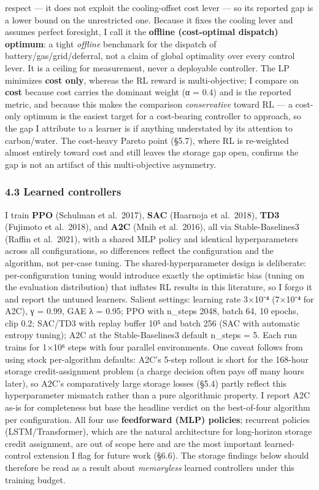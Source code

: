 \documentclass[
  11pt,
]{article}
\begin{document}
\begin{itemize}
  respect --- it does not exploit the cooling-offset cost lever --- so
  its reported gap is a lower bound on the unrestricted one. Because it
  fixes the cooling lever and assumes perfect foresight, I call it the
  \textbf{offline (cost-optimal dispatch) optimum}: a tight
  \emph{offline} benchmark for the dispatch of
  battery/gas/grid/deferral, not a claim of global optimality over every
  control lever. It is a ceiling for measurement, never a deployable
  controller. The LP minimizes \textbf{cost only}, whereas the RL reward
  is multi-objective; I compare on \textbf{cost} because cost carries
  the dominant weight (α = 0.4) and is the reported metric, and because
  this makes the comparison \emph{conservative} toward RL --- a
  cost-only optimum is the easiest target for a cost-bearing controller
  to approach, so the gap I attribute to a learner is if anything
  understated by its attention to carbon/water. The cost-heavy Pareto
  point (§5.7), where RL is re-weighted almost entirely toward cost and
  still leaves the storage gap open, confirms the gap is not an artifact
  of this multi-objective asymmetry.
\end{itemize}

\subsubsection{4.3 Learned controllers}\label{learned-controllers}

I train \textbf{PPO} (Schulman et al.~2017), \textbf{SAC} (Haarnoja et
al.~2018), \textbf{TD3} (Fujimoto et al.~2018), and \textbf{A2C} (Mnih
et al.~2016), all via Stable-Baselines3 (Raffin et al.~2021), with a
shared MLP policy and identical hyperparameters across all
configurations, so differences reflect the configuration and the
algorithm, not per-case tuning. The shared-hyperparameter design is
deliberate: per-configuration tuning would introduce exactly the
optimistic bias (tuning on the evaluation distribution) that inflates RL
results in this literature, so I forgo it and report the untuned
learners. Salient settings: learning rate 3×10⁻⁴ (7×10⁻⁴ for A2C), γ =
0.99, GAE λ = 0.95; PPO with n\_steps 2048, batch 64, 10 epochs, clip
0.2; SAC/TD3 with replay buffer 10⁵ and batch 256 (SAC with automatic
entropy tuning); A2C at the Stable-Baselines3 default n\_steps = 5. Each
run trains for 1×10⁶ steps with four parallel environments. One caveat
follows from using stock per-algorithm defaults: A2C's 5-step rollout is
short for the 168-hour storage credit-assignment problem (a charge
decision often pays off many hours later), so A2C's comparatively large
storage losses (§5.4) partly reflect this hyperparameter mismatch rather
than a pure algorithmic property. I report A2C as-is for completeness
but base the headline verdict on the best-of-four algorithm per
configuration. All four use \textbf{feedforward (MLP) policies};
recurrent policies (LSTM/Transformer), which are the natural
architecture for long-horizon storage credit assignment, are out of
scope here and are the most important learned-control extension I flag
for future work (§6.6). The storage findings below should therefore be
read as a result about \emph{memoryless} learned controllers under this
training budget.
\end{document}

